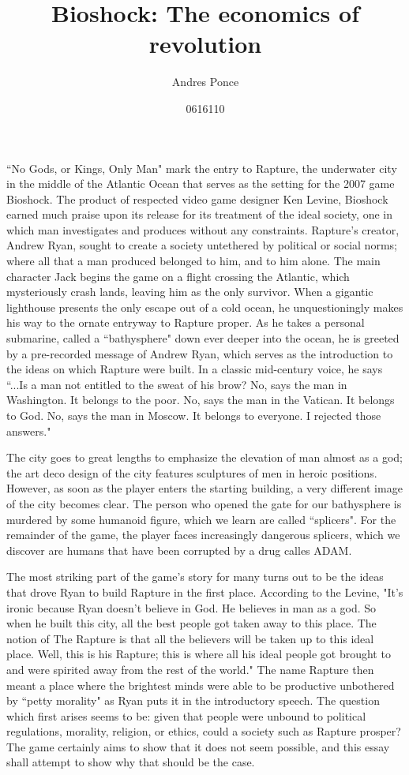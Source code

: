 \documentclass{article}
\title{Bioshock: The economics of revolution}
\author{Andres Ponce \\
\and
0616110
}
\begin{document}
\maketitle
``No Gods, or Kings, Only Man"\textcite{Bioshock} mark the entry to Rapture, the underwater city in the middle 
of the Atlantic Ocean
that serves as the setting for the 2007 game Bioshock. 
The product of respected video game designer Ken Levine, Bioshock earned much praise upon
its release for its treatment of the ideal society, one in which man investigates and produces without any 
constraints. Rapture's creator, Andrew Ryan, sought to create a society untethered by political or social 
norms; where all that a man produced belonged to him, and to him alone. The main character Jack begins the 
game on a flight crossing the Atlantic, which mysteriously crash lands, leaving him as the only survivor.
When a gigantic lighthouse presents the only escape out of a cold ocean, he unquestioningly makes his way
to the ornate entryway to Rapture proper. As he takes a personal submarine, called a ``bathysphere" down 
ever deeper into the ocean, he is greeted by a pre-recorded message of Andrew Ryan, which serves as the 
introduction to the ideas on which Rapture were built. In a classic mid-century voice, he says ``...Is a man
not entitled to the sweat of his brow? No, says the man in Washington. It belongs to the poor. No, says the 
man in the Vatican. It belongs to God. No, says the man in Moscow. It belongs to everyone. I rejected those
answers."\textcite{Bioshock}

The city goes to great lengths to emphasize the elevation of man almost as a god; the art deco design of the
city features sculptures of men in heroic positions. However, as soon as the player enters the starting 
building, a very different image of the city becomes clear. The person who opened the gate for our bathysphere
is murdered by some humanoid figure, which we learn are called ``splicers". For the remainder of the game, 
the player faces increasingly dangerous splicers, which we discover are humans that have been corrupted by 
a drug calles ADAM.

The most striking part of the game's story for many turns out to be the ideas that drove Ryan to build Rapture
in the first place. According to the Levine, "It's ironic because Ryan doesn't believe in God. He believes 
in man as a god. So when he built this city, all the best people got taken away to this place. The notion of 
The Rapture is that all the believers will be taken up to this ideal place. Well, this is his Rapture; this is
where all his ideal people got brought to and were spirited away from the rest of the world."
\textcite{LevineInterview} The name Rapture then meant a place where the brightest minds were able to 
be productive unbothered by ``petty morality" as Ryan  puts it in the introductory speech.  The question 
which first arises seems to be: given that people were unbound to political regulations, morality, religion,
or ethics, could a society such as Rapture prosper? The game certainly aims to show that it does not seem 
possible, and this essay shall attempt to show why that should be the case. 
\end{document}
